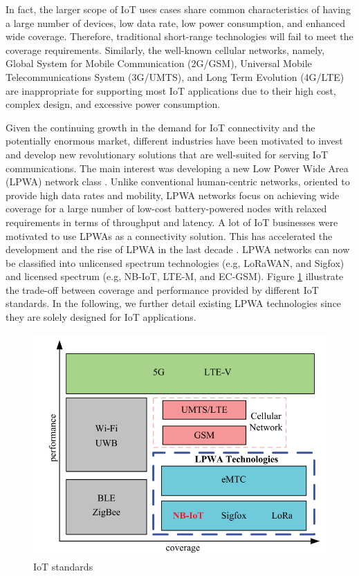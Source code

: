 \documentclass[]{IEEEtran}
\begin{document}
In fact, the larger scope of IoT uses cases share common characteristics of having a large number of devices, low data rate, low power consumption, and enhanced wide coverage. Therefore, traditional short-range technologies will fail to meet the coverage requirements.  Similarly, the well-known cellular networks, namely, Global System for Mobile Communication (2G/GSM), Universal Mobile Telecommunications System (3G/UMTS), and Long Term Evolution (4G/LTE) are inappropriate for supporting most IoT applications due to their high cost, complex design, and excessive power consumption.

Given the continuing growth in the demand for IoT connectivity and the potentially enormous market, different industries have been motivated to invest and develop new revolutionary solutions that are well-suited for serving IoT communications. The main interest was developing a new Low Power Wide Area (LPWA) network class \cite{akpakwu2017survey}. Unlike conventional human-centric networks, oriented to provide high data rates and mobility, LPWA networks focus on achieving wide coverage for a large number of low-cost battery-powered nodes with relaxed requirements in terms of throughput and latency. A lot of IoT businesses were motivated to use LPWAs as a connectivity solution. This has accelerated the development and the rise of LPWA in the last decade \cite{hwang_survey_2019}. LPWA networks can now be classified into unlicensed spectrum technologies (e.g, LoRaWAN, and Sigfox) and licensed spectrum (e.g, NB-IoT, LTE-M, and EC-GSM). Figure \ref{fig:nb-iot} illustrate the trade-off between coverage and performance provided by different IoT standards. In the following, we further detail existing LPWA technologies since they are solely designed for IoT applications.

\begin{figure}
    \centering
    \includegraphics[width=\linewidth]{Pictures/NB-IoT example.png}
    \caption{IoT standards}
    \label{fig:nb-iot}
\end{figure}
\end{document}
